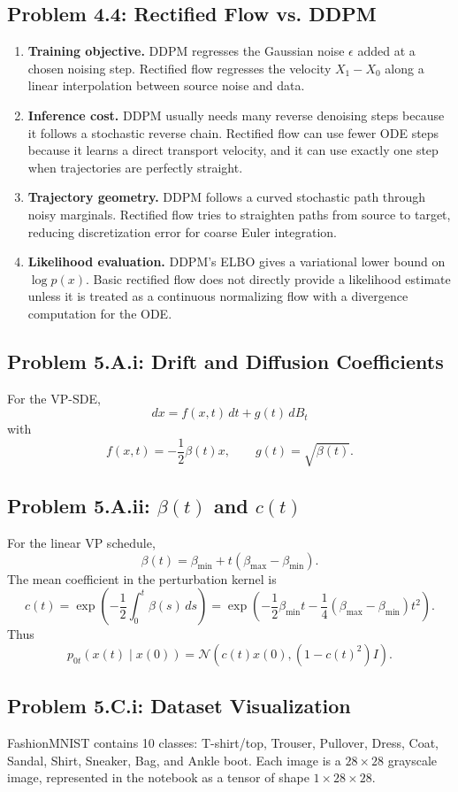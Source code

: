\documentclass[11pt]{article}
\newcommand{\N}{\mathcal{N}}
\newcommand{\Id}{I}
\begin{document}
\subsection*{Problem 4.4: Rectified Flow vs. DDPM}
\begin{enumerate}[label=(\arabic*)]
\item \textbf{Training objective.} DDPM regresses the Gaussian noise $\epsilon$ added at a chosen noising step.  Rectified flow regresses the velocity $X_1-X_0$ along a linear interpolation between source noise and data.
\item \textbf{Inference cost.} DDPM usually needs many reverse denoising steps because it follows a stochastic reverse chain.  Rectified flow can use fewer ODE steps because it learns a direct transport velocity, and it can use exactly one step when trajectories are perfectly straight.
\item \textbf{Trajectory geometry.} DDPM follows a curved stochastic path through noisy marginals.  Rectified flow tries to straighten paths from source to target, reducing discretization error for coarse Euler integration.
\item \textbf{Likelihood evaluation.} DDPM's ELBO gives a variational lower bound on $\log p(x)$.  Basic rectified flow does not directly provide a likelihood estimate unless it is treated as a continuous normalizing flow with a divergence computation for the ODE.
\end{enumerate}

\subsection*{Problem 5.A.i: Drift and Diffusion Coefficients}
For the VP-SDE,
\[
dx=f(x,t)\,dt+g(t)\,dB_t
\]
with
\[
f(x,t)=-\frac12\beta(t)x,
\qquad
g(t)=\sqrt{\beta(t)}.
\]

\subsection*{Problem 5.A.ii: $\beta(t)$ and $c(t)$}
For the linear VP schedule,
\[
\beta(t)=\beta_{\min}+t(\beta_{\max}-\beta_{\min}).
\]
The mean coefficient in the perturbation kernel is
\[
c(t)=\exp\left(-\frac12\int_0^t \beta(s)\,ds\right)
=\exp\left(-\frac12\beta_{\min}t-\frac14(\beta_{\max}-\beta_{\min})t^2\right).
\]
Thus
\[
p_{0t}(x(t)\mid x(0))
=\N\left(c(t)x(0),\left(1-c(t)^2\right)\Id\right).
\]

\subsection*{Problem 5.C.i: Dataset Visualization}
FashionMNIST contains 10 classes: T-shirt/top, Trouser, Pullover, Dress, Coat, Sandal, Shirt, Sneaker, Bag, and Ankle boot.  Each image is a $28\times 28$ grayscale image, represented in the notebook as a tensor of shape $1\times 28\times 28$.
\end{document}
